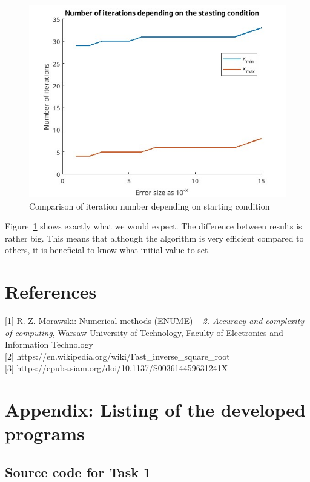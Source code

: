 \documentclass[11pt]{article}
\begin{document}
\begin{figure}
    \includegraphics[width=\textwidth]{sol7.jpg}
    \caption{Comparison of iteration number depending on starting condition}
    \label{fig:sol7}
\end{figure}

Figure~\ref{fig:sol7} shows exactly what we would expect. 
The difference between results is rather big. This means that although the
algorithm is very efficient compared to others, it is beneficial to know what
initial value to set. 

\newpage
\section{References}
{[1]} R. Z. Morawski: Numerical methods (ENUME) – \emph{2. Accuracy and
complexity of computing}, Warsaw University of Technology, Faculty of
Electronics and Information Technology \\
{[2]} https://en.wikipedia.org/wiki/Fast_inverse_square_root \\
{[3]} https://epubs.siam.org/doi/10.1137/S003614459631241X \\

\newpage
\section{Appendix: Listing of the developed programs}
\subsection{Source code for Task 1}

\newpage
\end{document}
